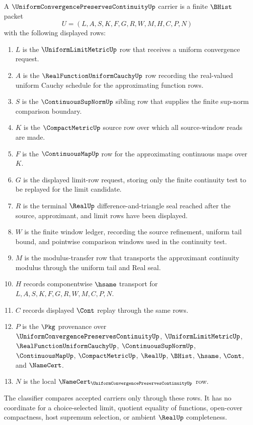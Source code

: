 \begin{definition}
\label{def:uniform-convergence-preserves-continuity-carrier}
A $\UniformConvergencePreservesContinuityUp$ carrier is a finite $\BHist$ packet
$$
U=(L,A,S,K,F,G,R,W,M,H,C,P,N)
$$
with the following displayed rows:
\begin{enumerate}
\item $L$ is the $\UniformLimitMetricUp$ row that receives a uniform convergence request.
\item $A$ is the $\RealFunctionUniformCauchyUp$ row recording the real-valued uniform Cauchy schedule for the approximating function rows.
\item $S$ is the $\ContinuousSupNormUp$ sibling row that supplies the finite sup-norm comparison boundary.
\item $K$ is the $\CompactMetricUp$ source row over which all source-window reads are made.
\item $F$ is the $\ContinuousMapUp$ row for the approximating continuous maps over $K$.
\item $G$ is the displayed limit-row request, storing only the finite continuity test to be replayed for the limit candidate.
\item $R$ is the terminal $\RealUp$ difference-and-triangle seal reached after the source, approximant, and limit rows have been displayed.
\item $W$ is the finite window ledger, recording the source refinement, uniform tail bound, and pointwise comparison windows used in the continuity test.
\item $M$ is the modulus-transfer row that transports the approximant continuity modulus through the uniform tail and Real seal.
\item $H$ records componentwise $\hsame$ transport for $L,A,S,K,F,G,R,W,M,C,P,N$.
\item $C$ records displayed $\Cont$ replay through the same rows.
\item $P$ is the $\Pkg$ provenance over $\UniformConvergencePreservesContinuityUp$, $\UniformLimitMetricUp$, $\RealFunctionUniformCauchyUp$, $\ContinuousSupNormUp$, $\ContinuousMapUp$, $\CompactMetricUp$, $\RealUp$, $\BHist$, $\hsame$, $\Cont$, and $\NameCert$.
\item $N$ is the local $\NameCert_{\UniformConvergencePreservesContinuityUp}$ row.
\end{enumerate}
The classifier compares accepted carriers only through these rows. It has no coordinate for a choice-selected limit, quotient equality of functions, open-cover compactness, host supremum selection, or ambient $\RealUp$ completeness.
\end{definition}


